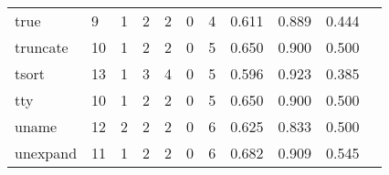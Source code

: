 \begin{longtable}{lp{1.20cm}p{1.20cm}p{1.20cm}p{1.20cm}p{1.20cm}p{1.20cm}p{1.20cm}p{1.20cm}p{1.20cm}p{1.20cm}}
true      &                                     9 &                                                  1 &                                                  2 &                                                  2 &                                                  0 &                                                  4 &                                         0.611 &                                              0.889 &                                              0.444 \\
truncate  &                                    10 &                                                  1 &                                                  2 &                                                  2 &                                                  0 &                                                  5 &                                         0.650 &                                              0.900 &                                              0.500 \\
tsort     &                                    13 &                                                  1 &                                                  3 &                                                  4 &                                                  0 &                                                  5 &                                         0.596 &                                              0.923 &                                              0.385 \\
tty       &                                    10 &                                                  1 &                                                  2 &                                                  2 &                                                  0 &                                                  5 &                                         0.650 &                                              0.900 &                                              0.500 \\
uname     &                                    12 &                                                  2 &                                                  2 &                                                  2 &                                                  0 &                                                  6 &                                         0.625 &                                              0.833 &                                              0.500 \\
unexpand  &                                    11 &                                                  1 &                                                  2 &                                                  2 &                                                  0 &                                                  6 &                                         0.682 &                                              0.909 &                                              0.545 \\

\end{longtable}
